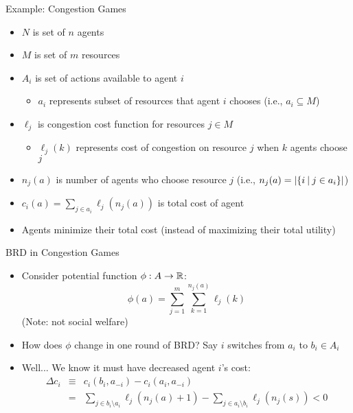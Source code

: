 \documentclass[11pt,aspectratio=169]{beamer}
\begin{document}
  
  \begin{frame}{Example: Congestion Games}
   \begin{itemize}[<+->]
   \setlength{\itemsep}{0.7em}
    \item $N$ is set of $n$ agents
    \item $M$ is set of $m$ \alert{resources}
    \item $A_i$ is set of actions available to agent $i$
    \begin{itemize}
     \item $a_i$ represents subset of resources that agent $i$ chooses (i.e., $a_i \subseteq M$)
    \end{itemize}
    \item $\ell_j$ is \alert{congestion cost function} for resources $j \in M$
    \begin{itemize}
     \item $\ell_j(k)$ represents cost of congestion on resource $j$ when $k$ agents choose $j$
    \end{itemize}
    \item $n_j(a)$ is number of agents who choose resource $j$ (i.e., $n_j(a) = \vert\{i \:\vert\: j \in a_i\}\vert$)
    \item $c_i(a) = \sum_{j \in a_i} \ell_j(n_j(a))$ is total cost of agent
    \item Agents minimize their total cost (instead of maximizing their total utility)
   \end{itemize}
  \end{frame}
  
  
  \begin{frame}{BRD in Congestion Games}
   \begin{itemize}
    \item<1-> Consider \alert{potential function}  $\phi:A\rightarrow \operatorname{\mathbb{R}}$:
    $$\phi(a) = \sum_{j=1}^m \sum_{k=1}^{n_j(a)} \ell_j(k)$$
    (Note: \alert{not} social welfare)
    \item<2-> How does $\phi$ change in one round of BRD? Say $i$ switches from $a_i$ to $b_i \in A_i$
    \item<3->Well... We know it must have decreased agent $i$'s cost:
    \begin{eqnarray*}
     \Delta c_i & \equiv & c_i(b_i, a_{-i}) - c_i(a_i, a_{-i}) \\ 
     & = & \sum_{j \in b_i\setminus a_i}\ell_j(n_j(a)+1) - \sum_{j \in a_i \setminus b_i}\ell_j(n_j(s)) < 0
    \end{eqnarray*}
   \end{itemize}
  \end{frame}
  
\end{document}
